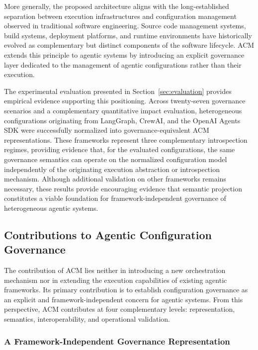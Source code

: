 \documentclass[10pt]{article}
\begin{document}
More generally, the proposed architecture aligns with the long-established separation between execution infrastructures and configuration management observed in traditional software engineering. Source code management systems, build systems, deployment platforms, and runtime environments have historically evolved as complementary but distinct components of the software lifecycle. ACM extends this principle to agentic systems by introducing an explicit governance layer dedicated to the management of agentic configurations rather than their execution.

The experimental evaluation presented in Section~\ref{sec:evaluation} provides empirical evidence supporting this positioning. Across twenty-seven governance scenarios and a complementary quantitative impact evaluation, heterogeneous configurations originating from LangGraph, CrewAI, and the OpenAI Agents SDK were successfully normalized into governance-equivalent ACM representations. These frameworks represent three complementary introspection regimes, providing evidence that, for the evaluated configurations, the same governance semantics can operate on the normalized configuration model independently of the originating execution abstraction or introspection mechanism. Although additional validation on other frameworks remains necessary, these results provide encouraging evidence that semantic projection constitutes a viable foundation for framework-independent governance of heterogeneous agentic systems.

\subsection{Contributions to Agentic Configuration Governance}
\label{sec:governance_contributions}

The contribution of ACM lies neither in introducing a new orchestration mechanism nor in extending the execution capabilities of existing agentic frameworks. Its primary contribution is to establish configuration governance as an explicit and framework-independent concern for agentic systems. From this perspective, ACM contributes at four complementary levels: representation, semantics, interoperability, and operational validation.

\subsubsection{A Framework-Independent Governance Representation}
\end{document}
